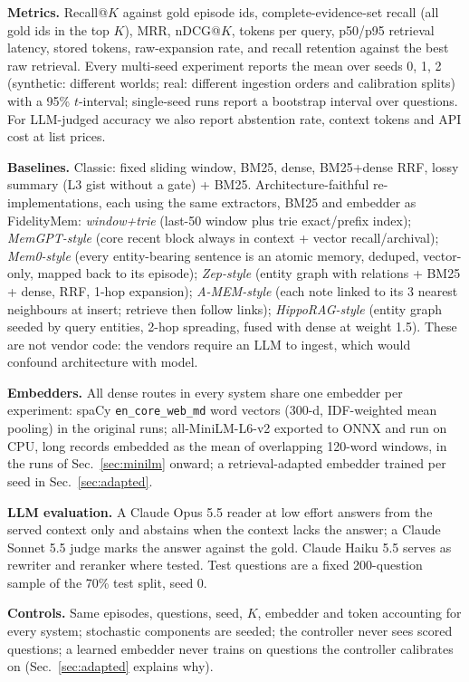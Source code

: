 \documentclass[journal]{IEEEtran}
\begin{document}
\textbf{Metrics.} Recall@$K$ against gold episode ids, complete-evidence-set recall (all gold ids in the top $K$), MRR, nDCG@$K$, tokens per query, p50/p95 retrieval latency, stored tokens, raw-expansion rate, and recall retention against the best raw retrieval. Every multi-seed experiment reports the mean over seeds 0, 1, 2 (synthetic: different worlds; real: different ingestion orders and calibration splits) with a 95\% $t$-interval; single-seed runs report a bootstrap interval over questions. For LLM-judged accuracy we also report abstention rate, context tokens and API cost at list prices.

\textbf{Baselines.} Classic: fixed sliding window, BM25, dense, BM25+dense RRF, lossy summary (L3 gist without a gate) + BM25. Architecture-faithful re-implementations, each using the same extractors, BM25 and embedder as FidelityMem: \emph{window+trie} (last-50 window plus trie exact/prefix index); \emph{MemGPT-style} (core recent block always in context + vector recall/archival); \emph{Mem0-style} (every entity-bearing sentence is an atomic memory, deduped, vector-only, mapped back to its episode); \emph{Zep-style} (entity graph with relations + BM25 + dense, RRF, 1-hop expansion); \emph{A-MEM-style} (each note linked to its 3 nearest neighbours at insert; retrieve then follow links); \emph{HippoRAG-style} (entity graph seeded by query entities, 2-hop spreading, fused with dense at weight 1.5). These are not vendor code: the vendors require an LLM to ingest, which would confound architecture with model.

\textbf{Embedders.} All dense routes in every system share one embedder per experiment: spaCy \texttt{en\_core\_web\_md} word vectors (300-d, IDF-weighted mean pooling) in the original runs; all-MiniLM-L6-v2 exported to ONNX and run on CPU, long records embedded as the mean of overlapping 120-word windows, in the runs of Sec.~\ref{sec:minilm} onward; a retrieval-adapted embedder trained per seed in Sec.~\ref{sec:adapted}.

\textbf{LLM evaluation.} A Claude Opus 5.5 reader at low effort answers from the served context only and abstains when the context lacks the answer; a Claude Sonnet 5.5 judge marks the answer against the gold. Claude Haiku 5.5 serves as rewriter and reranker where tested. Test questions are a fixed 200-question sample of the 70\% test split, seed 0.

\textbf{Controls.} Same episodes, questions, seed, $K$, embedder and token accounting for every system; stochastic components are seeded; the controller never sees scored questions; a learned embedder never trains on questions the controller calibrates on (Sec.~\ref{sec:adapted} explains why).
\end{document}
